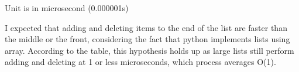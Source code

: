 \documentclass{article}
\begin{document}
\begin{itemize}
    Unit is in microsecond (0.000001s)

    I expected that adding and deleting items to the end of the list are faster than the middle or the front, considering the fact that python implements lists using array. According to the table, this hypothesis holds up as large lists still perform adding and deleting at 1 or less microseconds, which process averages O(1).
\end{itemize}
\end{document}
